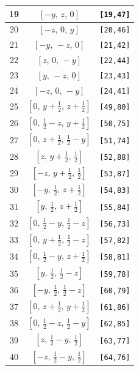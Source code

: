 \documentclass[fleqn,8pt]{jsarticle}
\begin{document}
\begin{longtable}{ccc}
19 & $\left[ - y,\, z,\, 0 \right]$ & {\tt [19,47]} \\ \hline
20 & $\left[ - z,\, 0,\, y \right]$ & {\tt [20,46]} \\ \hline
21 & $\left[ - y,\, - z,\, 0 \right]$ & {\tt [21,42]} \\ \hline
22 & $\left[ z,\, 0,\, - y \right]$ & {\tt [22,44]} \\ \hline
23 & $\left[ y,\, - z,\, 0 \right]$ & {\tt [23,43]} \\ \hline
24 & $\left[ - z,\, 0,\, - y \right]$ & {\tt [24,41]} \\ \hline
25 & $\left[ 0,\, y + \frac{1}{2},\, z + \frac{1}{2} \right]$ & {\tt [49,80]} \\ \hline
26 & $\left[ 0,\, \frac{1}{2} - z,\, y + \frac{1}{2} \right]$ & {\tt [50,75]} \\ \hline
27 & $\left[ 0,\, z + \frac{1}{2},\, \frac{1}{2} - y \right]$ & {\tt [51,74]} \\ \hline
28 & $\left[ z,\, y + \frac{1}{2},\, \frac{1}{2} \right]$ & {\tt [52,88]} \\ \hline
29 & $\left[ - z,\, y + \frac{1}{2},\, \frac{1}{2} \right]$ & {\tt [53,87]} \\ \hline
30 & $\left[ - y,\, \frac{1}{2},\, z + \frac{1}{2} \right]$ & {\tt [54,83]} \\ \hline
31 & $\left[ y,\, \frac{1}{2},\, z + \frac{1}{2} \right]$ & {\tt [55,84]} \\ \hline
32 & $\left[ 0,\, \frac{1}{2} - y,\, \frac{1}{2} - z \right]$ & {\tt [56,73]} \\ \hline
33 & $\left[ 0,\, y + \frac{1}{2},\, \frac{1}{2} - z \right]$ & {\tt [57,82]} \\ \hline
34 & $\left[ 0,\, \frac{1}{2} - y,\, z + \frac{1}{2} \right]$ & {\tt [58,81]} \\ \hline
35 & $\left[ y,\, \frac{1}{2},\, \frac{1}{2} - z \right]$ & {\tt [59,78]} \\ \hline
36 & $\left[ - y,\, \frac{1}{2},\, \frac{1}{2} - z \right]$ & {\tt [60,79]} \\ \hline
37 & $\left[ 0,\, z + \frac{1}{2},\, y + \frac{1}{2} \right]$ & {\tt [61,86]} \\ \hline
38 & $\left[ 0,\, \frac{1}{2} - z,\, \frac{1}{2} - y \right]$ & {\tt [62,85]} \\ \hline
39 & $\left[ z,\, \frac{1}{2} - y,\, \frac{1}{2} \right]$ & {\tt [63,77]} \\ \hline
40 & $\left[ - z,\, \frac{1}{2} - y,\, \frac{1}{2} \right]$ & {\tt [64,76]} \\ \hline

\end{longtable}
\end{document}
